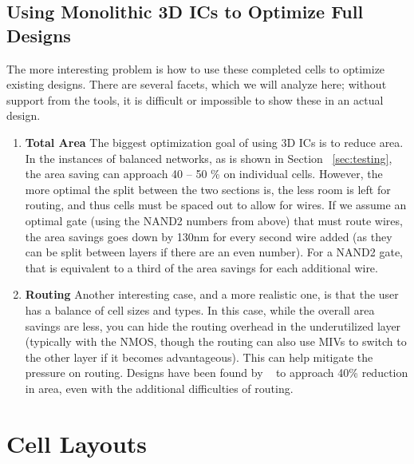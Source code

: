 \documentclass{article}
\begin{document}
\subsection{Using Monolithic 3D ICs to Optimize Full Designs} The more interesting problem is how to use these completed cells to optimize existing designs. There are several facets, which we will analyze here; without support from the tools, it is difficult or impossible to show these in an actual design. 
\begin{enumerate}
	\item \textbf{Total Area} The biggest optimization goal of using 3D ICs is to reduce area. In the instances of balanced networks, as is shown in Section ~\ref{sec:testing}, the area saving can approach 40 -- 50 \% on individual cells. However, the more optimal the split between the two sections is, the less room is left for routing, and thus cells must be spaced out to allow for wires. If we assume an optimal gate (using the NAND2 numbers from above) that must route wires, the area savings goes down by 130nm for every second wire added (as they can be split between layers if there are an even number). For a NAND2 gate, that is equivalent to a third of the area savings for each additional wire. 
	\item \textbf{Routing} Another interesting case, and a more realistic one, is that the user has a balance of cell sizes and types. In this case, while the overall area savings are less, you can hide the routing overhead in the underutilized layer (typically with the NMOS, though the routing can also use MIVs to switch to the other layer if it becomes advantageous). This can help mitigate the pressure on routing. Designs have been found by ~\cite{ULTRA} to approach 40\% reduction in area, even with the additional difficulties of routing. 

\end{enumerate}

\newpage

\clearpage
\section{Cell Layouts} 
\end{document}
